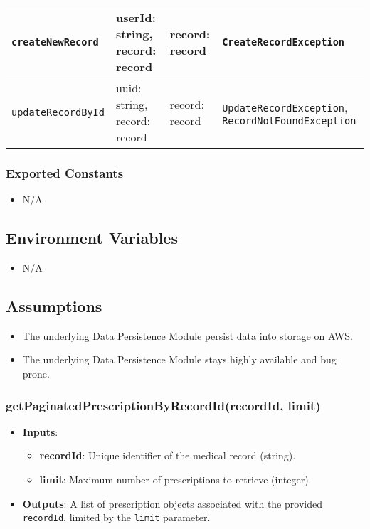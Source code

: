 \documentclass[12pt, titlepage]{article}
\begin{document}
\begin{center}
\begin{tabular}{|l|p{2.15cm}|p{2.25cm}|p{5.75cm}|}
    \hline
    \texttt{createNewRecord} & userId: string, \newline record: record & record: record & \texttt{CreateRecordException} \\
    \hline
    \texttt{updateRecordById} & uuid: string, \newline record: record & record: record & \texttt{UpdateRecordException}, \newline \texttt{RecordNotFoundException} \\
    \hline
\end{tabular}
\end{center}

\subsubsection{Exported Constants}
\begin{itemize}
\item N/A
\end{itemize}

\subsection{Environment Variables}
\begin{itemize}
  \item N/A
\end{itemize}

\subsection{Assumptions}
\begin{itemize}
    \item The underlying Data Persistence Module persist data into storage on AWS.
    \item The underlying Data Persistence Module stays highly available and bug prone.
\end{itemize}


\subsubsection{getPaginatedPrescriptionByRecordId(recordId, limit)}
\begin{itemize}
    \item \textbf{Inputs}:
        \begin{itemize}
            \item \textbf{recordId}: Unique identifier of the medical record (string).
            \item \textbf{limit}: Maximum number of prescriptions to retrieve (integer).
        \end{itemize}
    \item \textbf{Outputs}: A list of prescription objects associated with the provided \texttt{recordId}, limited by the \texttt{limit} parameter.
\end{itemize}
\end{document}
